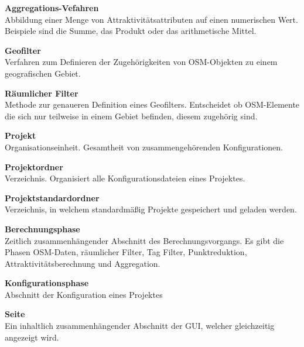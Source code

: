 \documentclass[parskip=full]{scrartcl} %
\begin{document}
\textbf{Aggregations-Vefahren}\\
Abbildung einer Menge von Attraktivitätsattributen auf einen numerischen Wert. Beispiele sind die Summe, das Produkt oder das arithmetische Mittel.

\textbf{Geofilter}\\
Verfahren zum Definieren der Zugehörigkeiten von OSM-Objekten zu einem geografischen Gebiet.

\textbf{Räumlicher Filter}\\
Methode zur genaueren Definition eines Geofilters. Entscheidet ob OSM-Elemente die sich nur teilweise in einem Gebiet befinden, diesem zugehörig sind.

\textbf{Projekt}\\
Organisationseinheit. Gesamtheit von zusammengehörenden Konfigurationen.

\textbf{Projektordner}\\
Verzeichnis. Organisiert alle Konfigurationsdateien eines Projektes.

\textbf{Projektstandardordner}\\
Verzeichnis, in welchem standardmäßig Projekte gespeichert und geladen werden.

\textbf{Berechnungsphase}\\
Zeitlich zusammenhängender Abschnitt des Berechnungsvorgangs. Es gibt die Phasen OSM-Daten, räumlicher Filter, Tag Filter, Punktreduktion, Attraktivitätsberechnung und Aggregation.

\textbf{Konfigurationsphase}\\
Abschnitt der Konfiguration eines Projektes

\textbf{Seite}\\
Ein inhaltlich zusammenhängender Abschnitt der GUI, welcher gleichzeitig angezeigt wird.
\end{document}
